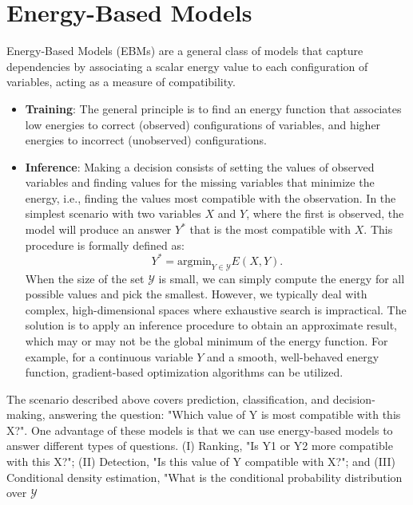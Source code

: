 \chapter{Energy-Based Models}\label{ch:ebms}

Energy-Based Models (EBMs) \cite{lecun2006tutorial} are a general class of models that capture dependencies by associating 
a scalar energy value to each configuration of variables, acting as a measure of compatibility.
\begin{itemize}
    \item \textbf{Training}: The general principle is to find an energy function that associates low energies to correct 
    (observed) configurations of variables, and higher energies to incorrect (unobserved) configurations.
    \item \textbf{Inference}: Making a decision consists of setting the values of observed variables and finding values 
    for the missing variables that minimize the energy, i.e., finding the values most compatible with the observation. 
    In the simplest scenario with two variables $X$ and $Y$, where the first is observed, the model will produce an 
    answer $Y^*$ that is the most compatible with $X$. This procedure is formally defined as:
    \begin{equation}
        Y^*=\text{argmin}_{Y\in \mathcal{Y}}E(X,Y).
    \end{equation} 
    When the size of the set $\mathcal{Y}$ is small, we can simply compute the energy for all possible values and pick 
    the smallest. However, we typically deal with complex, high-dimensional spaces where exhaustive search is impractical. 
    The solution is to apply an inference procedure to obtain an approximate result, which may or may not be the global 
    minimum of the energy function. For example, for a continuous variable $Y$ and a smooth, well-behaved energy function, 
    gradient-based optimization algorithms can be utilized.
\end{itemize}
The scenario described above covers prediction, classification, and decision-making, answering the question: "Which value 
of Y is most compatible with this X?". One advantage of these models is that we can use energy-based models to answer different 
types of questions. (I) Ranking, "Is Y1 or Y2 more compatible with this X?"; (II) Detection, "Is this value of Y compatible 
with X?"; and (III) Conditional density estimation, "What is the conditional probability distribution over $\mathcal{Y}$ 
